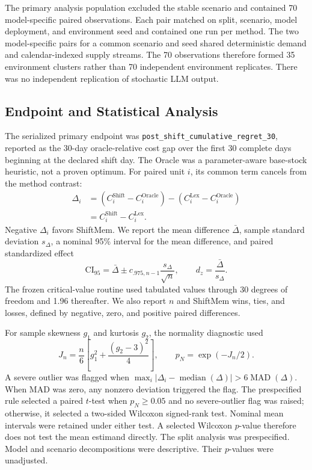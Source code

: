 The primary analysis population excluded the stable scenario and contained 70
model-specific paired observations. Each pair matched on split, scenario, model
deployment, and environment seed and contained one run per method. The two
model-specific pairs for a common scenario and seed shared deterministic demand
and calendar-indexed supply streams. The 70 observations therefore formed 35 environment clusters
rather than 70 independent environment replicates. There was no independent
replication of stochastic LLM output.

\subsection{Endpoint and Statistical Analysis}
\label{sec:statistical-analysis}

The serialized primary endpoint was
\texttt{post\_shift\_cumulative\_regret\_30}, reported as the 30-day
oracle-relative cost gap over the first 30 complete days beginning at the
declared shift day. The Oracle was a parameter-aware base-stock heuristic, not a
proven optimum. For paired unit $i$, its common term cancels from the method
contrast:
\begin{equation}
\begin{split}
 \Delta_i&=(C_i^{\mathrm{Shift}}-C_i^{\mathrm{Oracle}})
 -(C_i^{\mathrm{Lex}}-C_i^{\mathrm{Oracle}})\\
 &=C_i^{\mathrm{Shift}}-C_i^{\mathrm{Lex}}.
\end{split}
 \label{eq:primary-contrast}
\end{equation}
Negative $\Delta_i$ favors ShiftMem. We report the mean difference
$\bar\Delta$, sample standard deviation $s_\Delta$, a nominal 95\% interval for
the mean difference, and paired standardized effect
\begin{equation}
 \mathrm{CI}_{95}=\bar\Delta\pm c_{.975,n-1}
 \frac{s_\Delta}{\sqrt n},\qquad d_z=\frac{\bar\Delta}{s_\Delta}.
 \label{eq:effect-summary}
\end{equation}
The frozen critical-value routine used tabulated values through 30 degrees of
freedom and 1.96 thereafter. We also report $n$ and ShiftMem wins, ties, and
losses, defined by negative, zero, and positive paired differences.

For sample skewness $g_1$ and kurtosis $g_2$, the normality diagnostic used
\begin{equation}
 J_n=\frac{n}{6}\left[g_1^2+\frac{(g_2-3)^2}{4}\right],
 \qquad p_N=\exp(-J_n/2).
 \label{eq:normality-diagnostic}
\end{equation}
A severe outlier was flagged when
$\max_i|\Delta_i-\operatorname{median}(\Delta)|>6\operatorname{MAD}(\Delta)$.
When MAD was zero, any nonzero deviation triggered the flag. The prespecified
rule selected a paired $t$-test when $p_N\geq0.05$ and no severe-outlier flag
was raised; otherwise, it selected a two-sided Wilcoxon signed-rank test. Nominal
mean intervals were retained under either test. A selected Wilcoxon $p$-value
therefore does not test the mean estimand directly. The split analysis was
prespecified. Model and scenario decompositions were descriptive. Their
$p$-values were unadjusted.

